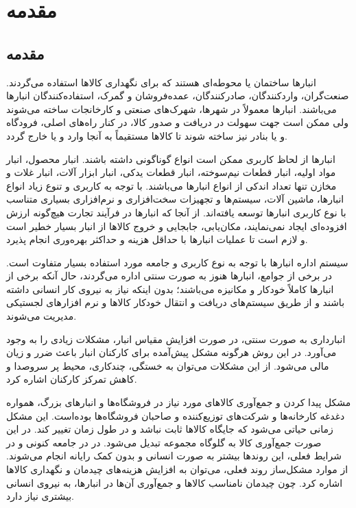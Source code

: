 \chapter{مقدمه}
\section{مقدمه}
انبارها ساختمان یا محوطه‌ای هستند که برای نگهداری کالاها استفاده می‌گردند. صنعت‌گران، واردکنندگان، صادرکنندگان، عمده‌فروشان و گمرک، استفاده‌کنندگان انبارها می‌باشند. انبارها معمولاً در شهرها، شهرک‌های صنعتی و کارخانجات ساخته می‌شوند ولی ممکن است جهت سهولت در دریافت و صدور کالا، در کنار راه‌های اصلی، فرودگاه و یا بنادر نیز ساخته شوند تا کالاها مستقیماً به آنجا وارد و یا خارج گردد.

انبار‌ها از لحاظ کاربری ممکن است انواع گوناگونی داشته باشند. انبار محصول، انبار مواد اولیه، انبار قطعات نیم‌سوخته، انبار قطعات یدکی، انبار ابزار آلات، انبار غلات و مخازن تنها تعداد اندکی از انواع انبارها می‌باشند. با توجه به کاربری و تنوع زیاد انواع انبارها، ماشین آلات، سیستم‌ها و تجهیزات سخت‌افزاری و نرم‌افزاری بسیاری متناسب با نوع کاربری انبارها توسعه یافته‌اند. از آنجا که انبارها در فرآیند تجارت هیچ‌گونه ارزش افزوده‌ای ایجاد نمی‌نمایند، مکان‌یابی، جابجایی و خروج کالاها از انبار بسیار خطیر است و لازم است تا عملیات انبارها با حداقل هزینه و حداکثر بهره‌وری انجام پذیرد.

سیستم اداره انبارها با توجه به نوع کاربری و جامعه مورد استفاده بسیار متفاوت است. در برخی از جوامع، انبارها هنوز به صورت سنتی اداره می‌گردند، حال آنکه برخی از انبارها کاملاً خودکار و مکانیزه می‌باشند؛ بدون اینکه نیاز به نیروی کار انسانی داشته باشند و از طریق سیستم‌های دریافت و انتقال خودکار کالاها و نرم افزارهای لجستیکی مدیریت می‌شوند.

انبارداری به صورت سنتی، در صورت افزایش مقیاس انبار، مشکلات زیادی را به وجود می‌آورد. در این روش هرگونه مشکل پیش‌آمده برای کارکنان انبار باعث ضرر و زیان مالی می‌شود. از این مشکلات می‌توان به خستگی، چندکاری، محیط پر سروصدا و کاهش تمرکز کارکنان اشاره کرد.
 
 
مشکل پیدا کردن و جمع‌آوری کالاهای مورد نیاز در فروشگاه‌ها و انبارهای بزرگ، همواره دغدغه کارخانه‌ها و شرکت‌های توزیع‌کننده و صاحبان فروشگاه‌ها بوده‌است. این مشکل زمانی حیاتی می‌شود که جایگاه کالاها ثابت نباشد و در طول زمان تغییر کند. در این صورت جمع‌آوری کالا به گلوگاه مجموعه تبدیل می‌شود. در در جامعه کنونی و در شرایط فعلی، این روندها بیشتر به صورت انسانی و بدون کمک رایانه انجام می‌شوند. از موارد مشکل‌ساز روند فعلی، می‌توان به افزایش هزینه‌های چیدمان و نگهداری کالاها اشاره کرد. چون چیدمان نامناسب کالاها و جمع‌آوری آن‌ها در انبارها، به نیروی انسانی بیشتری نیاز دارد.
 
